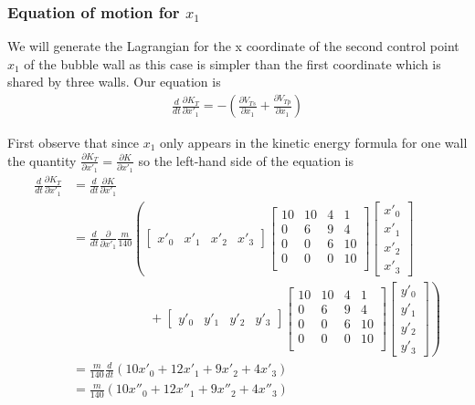 \documentclass{article}
\begin{document}
\subsubsection{Equation of motion for $x_1$}
We will generate the Lagrangian for the x coordinate of the second control
point $x_1$ of the bubble wall as this case is simpler than the first
coordinate which is shared by three walls.  Our equation is
\begin{align*}
 \frac{d}{d t} \frac{\partial K_T}{\partial x'_1} =-\left(\frac{\partial
 V_{Ts}}{\partial x_1} + \frac{\partial V_{Tp}}{\partial x_1}\right)
\end{align*}

First observe that since $x_1$ only appears in the kinetic energy formula for
one wall the quantity $\frac{\partial K_T}{\partial x'_1}=\frac{\partial K}{\partial x'_1}$
 so the left-hand side of the equation is 
\begin{align*}
\frac{d}{d t} \frac{\partial K_T}{\partial x'_1} &=
\frac{d}{d t} \frac{\partial K}{\partial x'_1}\\
 &= \frac{d}{d t}
 \frac{\partial }{\partial x'_1} \frac{m}{140} \left(
\begin{bmatrix} x'_0 & x'_1 & x'_2 & x'_3 \end{bmatrix}
 \begin{bmatrix} 
10 & 10 & 4 & 1\\
0 & 6 & 9 & 4\\
0 & 0 & 6 & 10\\
0 & 0 & 0 & 10\\ 
\end{bmatrix}
\begin{bmatrix} x'_0\\x'_1\\x'_2\\x'_3 \end{bmatrix}
\right.\\
&\qquad\qquad\qquad+ \left.
\begin{bmatrix} y'_0 & y'_1 & y'_2 & y'_3 \end{bmatrix}
 \begin{bmatrix} 
10 & 10 & 4 & 1\\
0 & 6 & 9 & 4\\
0 & 0 & 6 & 10\\
0 & 0 & 0 & 10\\ 
\end{bmatrix}
\begin{bmatrix} y'_0\\y'_1\\y'_2\\y'_3 \end{bmatrix} 
\right)\\ 
&= \frac{m}{140} \frac{d}{d t}\left(10x'_0+12x'_1+9x'_2+4x'_3 \right)\\
&= \frac{m}{140} \left(10x''_0+12x''_1+9x''_2+4x''_3 \right)
\end{align*}
\end{document}
